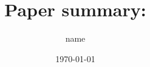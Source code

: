 \documentclass{beamer}
\title[Paper summary]{Paper summary: \fullcite{einstein}}
\author{name}
\date{\today}
\begin{document}
\begin{frame}[plain]
    \titlepage
\end{frame} 

\begin{frame}
\printbibliography
\end{frame}
\end{document}
